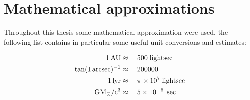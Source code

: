\chapter{Mathematical approximations}

Throughout this thesis some mathematical approximation were used, the following
list contains in particular some useful unit conversions and estimates:

\begin{align}
    1\,\AU &\approx\quad 500\;\lightsec\eqlbl{au}\\
    \tan(1\,\arcsec)^{-1} &\approx\quad 200000\eqlbl{arcsectan}\\
    1\,\lyr &\approx\quad \pi \times 10^{7}\;\lightsec\eqlbl{lyr}\\
    \Grav\Msol/\lspeed^{3} &\approx\quad 5 \times 10^{-6}\;\sec\eqlbl{GMcinsec}
\end{align}
